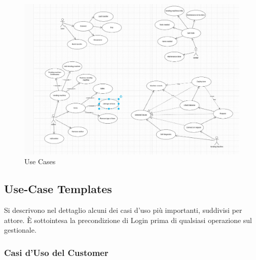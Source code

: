 \begin{figure}
    \centering
    \includegraphics[width=0.5\linewidth]{assets/use-cases.jpeg}
    \caption{Use Cases}
    \label{fig:use cases}
\end{figure}

\subsection{Use-Case Templates}
Si descrivono nel dettaglio alcuni dei casi d'uso più importanti, suddivisi per attore. È sottointesa la precondizione di Login prima di qualsiasi operazione sul gestionale.

\subsubsection{Casi d'Uso del Customer}

